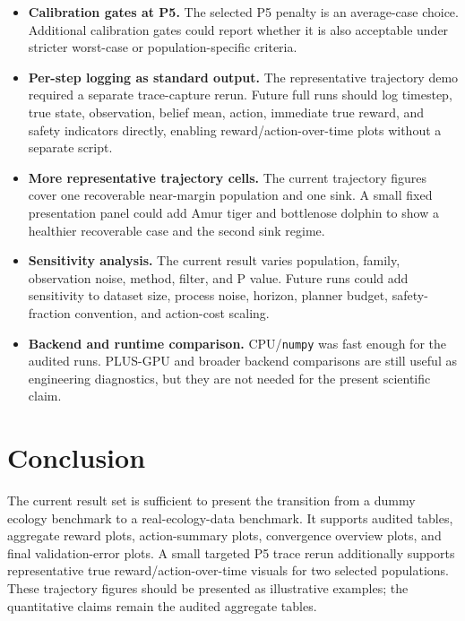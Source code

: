 \documentclass[11pt]{article}
\begin{document}
\begin{itemize}
    \item \textbf{Calibration gates at P5.} The selected P5 penalty is an
    average-case choice. Additional calibration gates could report whether it
    is also acceptable under stricter worst-case or population-specific
    criteria.
    \item \textbf{Per-step logging as standard output.} The representative
    trajectory demo required a separate trace-capture rerun. Future full runs
    should log timestep, true state, observation, belief mean, action, immediate
    true reward, and safety indicators directly, enabling reward/action-over-time
    plots without a separate script.
    \item \textbf{More representative trajectory cells.} The current trajectory
    figures cover one recoverable near-margin population and one sink. A small
    fixed presentation panel could add Amur tiger and bottlenose dolphin to
    show a healthier recoverable case and the second sink regime.
    \item \textbf{Sensitivity analysis.} The current result varies population,
    family, observation noise, method, filter, and P value. Future runs could
    add sensitivity to dataset size, process noise, horizon, planner budget,
    safety-fraction convention, and action-cost scaling.
    \item \textbf{Backend and runtime comparison.} CPU/\texttt{numpy} was fast
    enough for the audited runs. PLUS-GPU and broader backend comparisons are
    still useful as engineering diagnostics, but they are not needed for the
    present scientific claim.
\end{itemize}

\section{Conclusion}

The current result set is sufficient to present the transition from a dummy
ecology benchmark to a real-ecology-data benchmark. It supports audited tables,
aggregate reward plots, action-summary plots, convergence overview plots, and
final validation-error plots. A small targeted P5 trace rerun additionally
supports representative true reward/action-over-time visuals for two selected
populations. These trajectory figures should be presented as illustrative
examples; the quantitative claims remain the audited aggregate tables.
\end{document}
